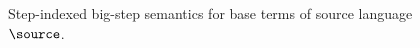 \begin{figure}
  \footnotesize
  \begin{mathpar}



  \end{mathpar}
  \caption{Step-indexed big-step semantics for base terms of source language $\source$.}
  \label{fig:source-definition-base-terms-semantics}
\end{figure}